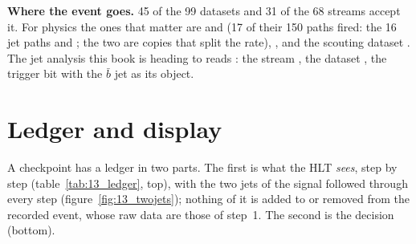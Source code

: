 \textbf{Where the event goes.} 45 of the 99 datasets and 31 of the 68 streams accept it. For physics the ones that
matter are  and  (17 of their 150 paths fired: the 16 jet paths and
; the two are copies that split the rate), , and the scouting dataset
. The jet analysis this
book is heading to reads : the stream , the dataset , the trigger bit
 with the $\bar b$ jet as its object.

\FloatBarrier
\section{Ledger and display}

A checkpoint has a ledger in two parts. The first is what the HLT \emph{sees}, step by step
(table~\ref{tab:13_ledger}, top), with the two jets of the signal followed through every step
(figure~\ref{fig:13_twojets}); nothing of it is added to or removed from the recorded event, whose raw data are those
of step~1. The second is the decision (bottom).

